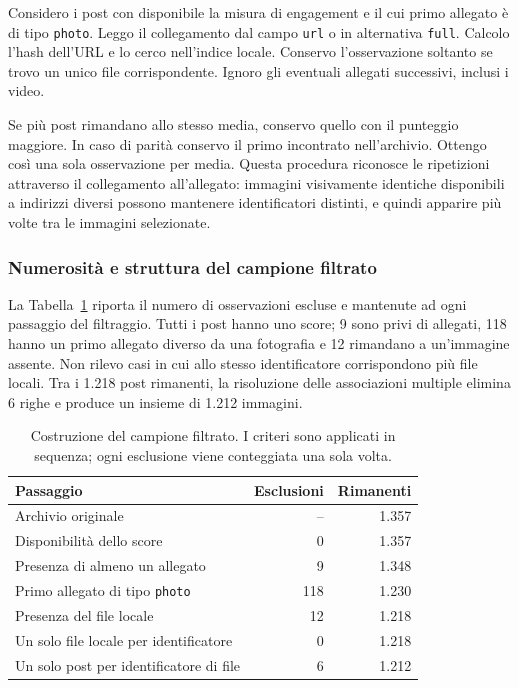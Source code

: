 Considero i post con disponibile la misura di engagement e il cui primo allegato è di tipo \texttt{photo}. Leggo il collegamento dal campo \texttt{url} o in alternativa \texttt{full}. Calcolo l'hash dell'URL e lo cerco nell'indice locale. Conservo l'osservazione soltanto se trovo un unico file corrispondente. Ignoro gli eventuali allegati successivi, inclusi i video.

Se più post rimandano allo stesso media, conservo quello con il punteggio maggiore. In caso di parità conservo il primo incontrato nell'archivio. Ottengo così una sola osservazione per media. Questa procedura riconosce le ripetizioni attraverso il collegamento all'allegato: immagini visivamente identiche disponibili a indirizzi diversi possono mantenere identificatori distinti, e quindi apparire più volte tra le immagini selezionate.

\subsubsection{Numerosità e struttura del campione filtrato}
\label{subsec:dataset-campione-filtrato}

La Tabella~\ref{tab:dataset-selezione} riporta il numero di osservazioni escluse e mantenute ad ogni passaggio del filtraggio. Tutti i post hanno uno score; 9 sono privi di allegati, 118 hanno un primo allegato diverso da una fotografia e 12 rimandano a un'immagine assente. Non rilevo casi in cui allo stesso identificatore corrispondono più file locali. Tra i 1.218 post rimanenti, la risoluzione delle associazioni multiple elimina 6 righe e produce un insieme di 1.212 immagini.

\begin{table}[htbp]
    \centering
    \caption{Costruzione del campione filtrato. I criteri sono applicati in sequenza; ogni esclusione viene conteggiata una sola volta.}
    \label{tab:dataset-selezione}
    \begin{tabular}{@{}p{}rr@{}}
        \toprule
        Passaggio & Esclusioni & Rimanenti \\
        \midrule
        Archivio originale & -- & 1.357 \\
        Disponibilità dello score & 0 & 1.357 \\
        Presenza di almeno un allegato & 9 & 1.348 \\
        Primo allegato di tipo \texttt{photo} & 118 & 1.230 \\
        Presenza del file locale & 12 & 1.218 \\
        Un solo file locale per identificatore & 0 & 1.218 \\
        Un solo post per identificatore di file & 6 & 1.212 \\
        \bottomrule
    \end{tabular}
\end{table}

